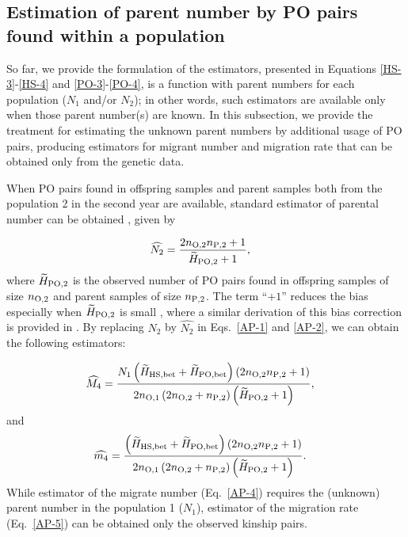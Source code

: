 \documentclass[12pt, English]{article}
\begin{document}
\begin{spacing}{1.9}
\subsection{Estimation of parent number by PO pairs found within a population}

So far, we provide the formulation of the estimators, presented in Equations \ref{HS-3}-\ref{HS-4} and \ref{PO-3}-\ref{PO-4}, is a function with parent numbers for each population ($N_1$ and/or $N_2$); in other words, such estimators are available only when those parent number(s) are known. In this subsection, we provide the treatment for estimating the unknown parent numbers by additional usage of PO pairs, producing estimators for migrant number and migration rate that can be obtained only from the genetic data. 

When PO pairs found in offspring samples and parent samples both from the population 2 in the second year are available, standard estimator of parental number can be obtained \cite[]{bravington2016close}, given by

\begin{align}
\widehat{N_2} &= \frac{ 2 n_{\rm O, 2} n_{\rm P, 2} + 1 }{\widetilde{H}_{\rm PO, 2} + 1} ,
\label{AP-3}
\end{align}
where $\widetilde{H}_{\rm PO, 2}$ is the observed number of PO pairs found in offspring samples of size $n_{\rm O, 2}$ and parent samples of size $n_{\rm P, 2}$. The term ``$+1$'' reduces the bias especially when $\widetilde{H}_{\rm PO, 2}$ is small \cite[e.g.,][]{ecolevol2021p}, where a similar derivation of this bias correction is provided in \cite{Akita_2019}. By replacing $N_2$ by $\widehat{N_2}$ in Eqs.~\ref{AP-1} and \ref{AP-2}, we can obtain the following estimators: 

\begin{align}
\widehat{M_4} &=  \frac{ N_{1} \left(\widetilde{H}_{\rm HS,bet} + \widetilde{H}_{\rm PO,bet}\right) \left(2 n_{\rm O, 2} n_{\rm P, 2} + 1\right)} {2n_{\rm O, 1} \left(2 n_{\rm O, 2} + n_{\rm P, 2}\right) \left(\widetilde{H}_{\rm PO, 2} + 1\right)},
\label{AP-4}
\end{align}
and
\begin{align}
\widehat{m_4} &=  \frac{ \left(\widetilde{H}_{\rm HS,bet} + \widetilde{H}_{\rm PO,bet}\right) \left(2 n_{\rm O, 2} n_{\rm P, 2} + 1\right)} {2n_{\rm O, 1} \left(2 n_{\rm O, 2} + n_{\rm P, 2}\right) \left(\widetilde{H}_{\rm PO, 2} + 1\right)}.
\label{AP-5}
\end{align}
While estimator of the migrate number (Eq.~\ref{AP-4}) requires the (unknown) parent number in the population 1 ($N_{1}$), estimator of the migration rate (Eq.~\ref{AP-5}) can be obtained only the observed kinship pairs. 


\end{spacing}
\end{document}
